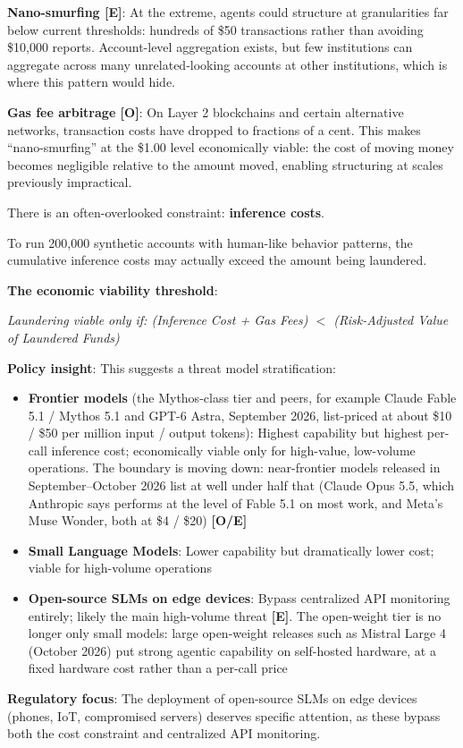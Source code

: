 \documentclass[11pt,letterpaper]{article}
\begin{document}
\textbf{Nano-smurfing [E]}: At the extreme, agents could structure at granularities far below current thresholds: hundreds of \$50 transactions rather than avoiding \$10,000 reports. Account-level aggregation exists, but few institutions can aggregate across many unrelated-looking accounts at other institutions, which is where this pattern would hide.

\textbf{Gas fee arbitrage [O]}: On Layer 2 blockchains and certain alternative networks, transaction costs have dropped to fractions of a cent. This makes ``nano-smurfing'' at the \$1.00 level economically viable: the cost of moving money becomes negligible relative to the amount moved, enabling structuring at scales previously impractical.

\begin{infobox}
There is an often-overlooked constraint: \textbf{inference costs}.

To run 200,000 synthetic accounts with human-like behavior patterns, the cumulative inference costs may actually exceed the amount being laundered.

\textbf{The economic viability threshold}:
\begin{center}
\textit{Laundering viable only if: (Inference Cost + Gas Fees) $<$ (Risk-Adjusted Value of Laundered Funds)}
\end{center}

\textbf{Policy insight}: This suggests a threat model stratification:
\begin{itemize}
  \item \textbf{Frontier models} (the Mythos-class tier and peers, for example Claude Fable 5.1 / Mythos 5.1 and GPT-6 Astra, September 2026, list-priced at about \$10 / \$50 per million input / output tokens): Highest capability but highest per-call inference cost; economically viable only for high-value, low-volume operations. The boundary is moving down: near-frontier models released in September--October 2026 list at well under half that (Claude Opus 5.5, which Anthropic says performs at the level of Fable 5.1 on most work, and Meta's Muse Wonder, both at \$4 / \$20) \textbf{[O/E]}
  \item \textbf{Small Language Models}: Lower capability but dramatically lower cost; viable for high-volume operations
  \item \textbf{Open-source SLMs on edge devices}: Bypass centralized API monitoring entirely; likely the main high-volume threat \textbf{[E]}. The open-weight tier is no longer only small models: large open-weight releases such as Mistral Large 4 (October 2026) put strong agentic capability on self-hosted hardware, at a fixed hardware cost rather than a per-call price
\end{itemize}

\textbf{Regulatory focus}: The deployment of open-source SLMs on edge devices (phones, IoT, compromised servers) deserves specific attention, as these bypass both the cost constraint and centralized API monitoring.
\end{infobox}
\end{document}
